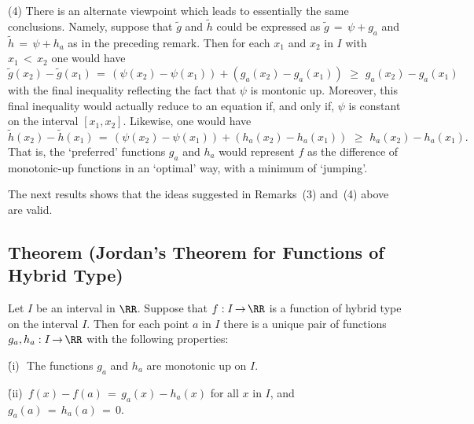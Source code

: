         (4) There is an alternate viewpoint which leads to essentially the same conclusions.
    Namely, suppose that $\tilde{g}$ and $\tilde{h}$ could be expressed as $\tilde{g} \,=\, {\psi}+g_{a}$ and $\tilde{h} \,=\, {\psi}+h_{a}$ as in the preceding remark.
    Then for each $x_{1}$ and $x_{2}$ in $I$ with $x_{1}\,<\,x_{2}$ one would have
        \begin{displaymath}
        \tilde{g}(x_{2}) - \tilde{g}(x_{1}) \,=\, ({\psi}(x_{2})-{\psi}(x_{1})) + (g_{a}(x_{2})-g_{a}(x_{1}))\,\,{\geq}\,\,g_{a}(x_{2}) - g_{a}(x_{1})
        \end{displaymath}
    with the final inequality reflecting the fact that ${\psi}$ is montonic up.
    Moreover, this final inequality would actually reduce to an equation if, and only if, ${\psi}$ is constant on the interval $[x_{1},x_{2}]$.
    Likewise, one would have
        \begin{displaymath}
        \tilde{h}(x_{2}) - \tilde{h}(x_{1}) \,=\, ({\psi}(x_{2})-{\psi}(x_{1})) + (h_{a}(x_{2})-h_{a}(x_{1}))\,\,{\geq}\,\,h_{a}(x_{2}) - h_{a}(x_{1}).
        \end{displaymath}
    That is, the `preferred' functions $g_{a}$ and $h_{a}$ would represent $f$ as the difference of monotonic-up functions in an `optimal' way, with a minimum of `jumping'.

\V
\V

        The next results shows that the ideas suggested in Remarks~(3) and~(4) above are valid.

\V
\V


             \subsection{\small{\bf Theorem} (Jordan's Theorem for Functions of Hybrid Type)}
            \label{ThmF40.110}

\V

        Let $I$ be an interval in ${\RR}$. Suppose that $f:I \,{\rightarrow}\, {\RR}$ is a function of hybrid type on the interval $I$.
    Then for each point $a$ in $I$ there is a unique pair of functions $g_{a},h_{a}:I \,{\rightarrow}\, {\RR}$ with the following properties:

\V

        \h (i)\,\, The functions $g_{a}$ and $h_{a}$ are monotonic up on $I$.

\V

        \h (ii)\, $f(x) - f(a) \,=\, g_{a}(x)-h_{a}(x)$ for all $x$ in $I$, and $g_{a}(a) \,=\, h_{a}(a) \,=\, 0$.

